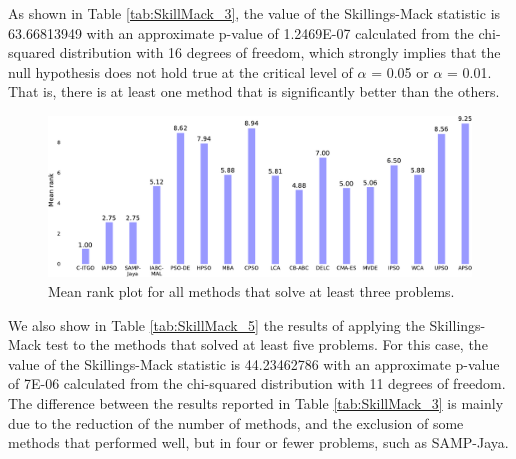 


As shown in Table \ref{tab:SkillMack_3}, the value of the Skillings-Mack statistic is 63.66813949 with an approximate p-value of 1.2469E-07 calculated from the chi-squared distribution with 16 degrees of freedom, which strongly implies that the null hypothesis does not hold true at the critical level of $\alpha$ = 0.05 or $\alpha$ = 0.01. That is, there is at least one method that is significantly better than the others. 



\begin{figure}[h]
    \begin{center}
    \includegraphics[scale=0.6]{img/Statistics/SkillMack_3-crop.pdf}
    \end{center}
    \captionsetup{justification=centering}
    \vspace*{-4mm}
    \caption{Mean rank plot for all methods that solve at least three problems.}\label{fig:SkillMack_3}
\end{figure}



We also show in Table \ref{tab:SkillMack_5} the results of applying the Skillings-Mack test to the methods that solved at least five problems. For this case, the value of the Skillings-Mack statistic is 44.23462786 with an approximate p-value of 7E-06 calculated from the chi-squared distribution with 11 degrees of freedom. The difference between the results reported in Table \ref{tab:SkillMack_3} is mainly due to the reduction of the number of methods, and the exclusion of some methods that performed well, but in four or fewer problems, such as SAMP-Jaya.



